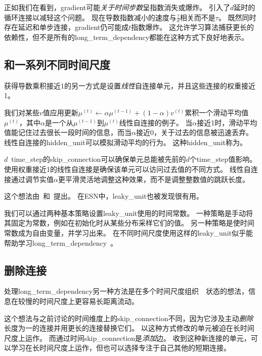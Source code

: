 正如我们在看到，\gls{gradient}可能\emph{关于时间步数}呈指数消失或爆炸。
\citep{Lin-ieeetnn96}引入了$d$延时的循环连接以减轻这个问题。
现在导数指数减小的速度与$\frac{\tau}{d}$相关而不是$\tau$。
既然同时存在延迟和单步连接，\gls{gradient}仍可能成$t$指数爆炸。
这允许学习算法捕获更长的依赖性，但不是所有的\gls{long_term_dependency}都能在这种方式下良好地表示。


\subsection{和一系列不同时间尺度}
\label{sec:leaky_units_and_a_spectrum_of_different_time_scales}
获得导数乘积接近1的另一方式是设置\emph{线性}自连接单元，并且这些连接的权重接近1。

我们对某些$v$值应用更新$\mu^{(t)} \gets \alpha \mu^{(t-1)} + (1-\alpha) v^{(t)}$累积一个滑动平均值$\mu^{(t)}$，其中$\alpha$是一个从$ \mu^{(t-1)}$到$ \mu^{(t)}$线性自连接的例子。
当$\alpha$接近1时，滑动平均值能记住过去很长一段时间的信息，而当$\alpha$接近0，关于过去的信息被迅速丢弃。
线性自连接的\gls{hidden_unit}可以模拟滑动平均的行为。
这种\gls{hidden_unit}称为。

$d$~\gls{time_step}的\gls{skip_connection}可以确保单元总能被先前的$d$个\gls{time_step}值影响。
使用权重接近1的线性自连接是确保该单元可以访问过去值的不同方式。
线性自连接通过调节实值$\alpha$更平滑灵活地调整这种效果，而不是调整整数值的跳跃长度。

这个想法由~\cite{Mozer-nips92}和~\cite{ElHihi+Bengio-nips8}提出。
在\gls{ESN}中，\gls{leaky_unit}也被发现很有用\citep{JaegerLPS07}。

我们可以通过两种基本策略设置\gls{leaky_unit}使用的时间常数。
一种策略是手动将其固定为常数，例如在初始化时从某些分布采样它们的值。
另一种策略是使时间常数成为自由变量，并学习出来。
在不同时间尺度使用这样的\gls{leaky_unit}似乎能帮助学习\gls{long_term_dependency}~\citep{Mozer-nips92,Pascanu+al-ICML2013-small}。

\subsection{删除连接}
\label{sec:removing_connections}
处理\gls{long_term_dependency}另一种方法是在多个时间尺度组织~~状态的想法\citep{ElHihi+Bengio-nips8}，信息在较慢的时间尺度上更容易长距离流动。

这个想法与之前讨论的时间维度上的\gls{skip_connection}不同，因为它涉及主动\emph{删除}长度为一的连接并用更长的连接替换它们。
以这种方式修改的单元被迫在长时间尺度上运作。
而通过时间\gls{skip_connection}是\emph{添加}边。
收到这种新连接的单元，可以学习在长时间尺度上运作，但也可以选择专注于自己其他的短期连接。

